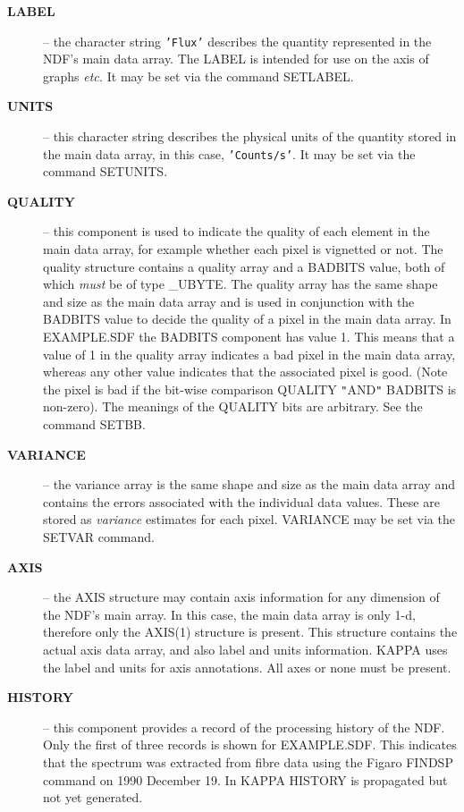 {\begin{description}
\item[{\bf LABEL}] -- the character string {\tt'Flux'} describes the
quantity represented in the NDF's main data array. The LABEL is
intended for use on the axis of graphs {\it etc.}  It may be set
via the command SETLABEL.  

\item[{\bf UNITS}] -- this character string
describes the physical units of the quantity stored in the main data 
array, in this case, {\tt'Counts/s'}.  It may be set
via the command SETUNITS.  

\item[{\bf QUALITY}] -- this component is used to indicate
the quality of each element in the main data array, for example
whether each pixel is vignetted or not.
The quality structure contains a 
quality array and a BADBITS value, both of which {\sl must\/} be of 
type \_UBYTE.  
The quality array has the same shape and size as
the main data array and is used in conjunction with the BADBITS value 
to decide the quality of a pixel in the main data array.
In EXAMPLE.SDF the BADBITS component has value 1.
This means that a value of 1 in the quality array indicates a bad pixel
in the main data array, whereas any other value indicates that 
the associated pixel is good.  (Note the pixel is bad
if the bit-wise comparison QUALITY {\tt "}AND{\tt "} BADBITS is non-zero).
The meanings of the QUALITY bits are arbitrary.  See the command SETBB.

\item[{\bf VARIANCE}] -- the variance array is the same shape and size
as the main data array and contains the errors 
associated with the individual data values. 
These are stored as {\sl variance\/} estimates for each
pixel.  VARIANCE may be set via the SETVAR command.

\item[{\bf AXIS}] -- the AXIS structure may contain axis information for
any dimension of the NDF's main array. In this case, the main data array
is only 1-d, therefore only the AXIS(1) structure is present. This
structure contains the actual axis data array, and also label and units
information.  {\small KAPPA} uses the label and units for axis
annotations.  All axes or none must be present. 

\item[{\bf HISTORY}] -- this component provides a record of the
processing history of the NDF. Only the first of three records is shown
for EXAMPLE.SDF. This indicates that the spectrum was extracted from
fibre data using the Figaro FINDSP command on 1990 December 19.  In
{\small KAPPA} HISTORY is propagated but not yet generated. 


\end{description}}
